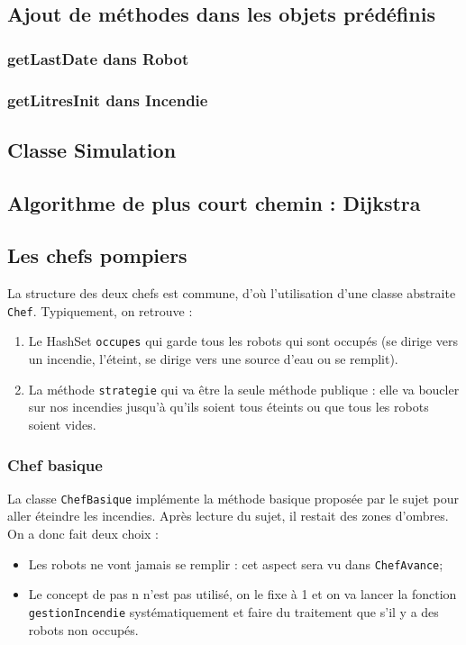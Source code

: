 \documentclass[a4paper,8pt]{article} %
\begin{document}
\subsection{Ajout de méthodes dans les objets prédéfinis}
\subsubsection{getLastDate dans Robot}
\subsubsection{getLitresInit dans Incendie}
\subsection{Classe Simulation}
\subsection{Algorithme de plus court chemin : Dijkstra} %
\subsection{Les chefs pompiers}
La structure des deux chefs est commune, d'où l'utilisation d'une classe abstraite \texttt{Chef}. Typiquement, on retrouve :
\begin{enumerate}
    \item Le HashSet \texttt{occupes} qui garde tous les robots qui sont occupés (se dirige vers un incendie, l'éteint,
    se dirige vers une source d'eau ou se remplit).
    \item La méthode \texttt{strategie} qui va être la seule méthode publique : elle va boucler sur nos incendies jusqu'à qu'ils
    soient tous éteints ou que tous les robots soient vides.
\end{enumerate}

\subsubsection{Chef basique}
La  classe \texttt{ChefBasique} implémente la méthode basique proposée par le sujet pour aller éteindre les incendies.
Après lecture du sujet, il restait des zones d'ombres. On a donc fait deux choix :
\begin{itemize}
    \item Les robots ne vont jamais se remplir : cet aspect sera vu dans \texttt{ChefAvance};
    \item Le concept de pas n n'est pas utilisé, on le fixe à 1 et on va lancer la fonction \texttt{gestionIncendie} systématiquement 
    et faire du traitement que s'il y a des robots non occupés.
\end{itemize}
\end{document}
